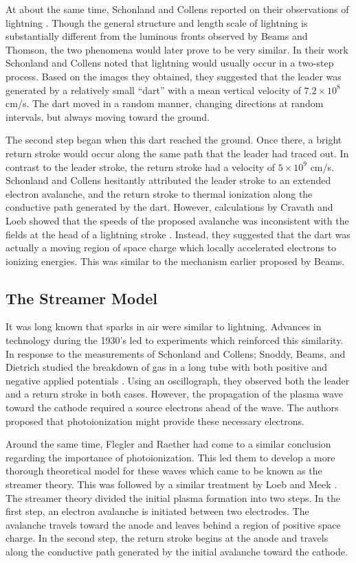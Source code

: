 At about the same time, Schonland and Collens reported on their observations of
lightning \cite{Schonland1933}. Though the general structure and length scale of
lightning is substantially different from the luminous fronts observed by Beams
and Thomson, the two phenomena would later prove to be very similar. In their
work Schonland and Collens noted that lightning would usually occur in a
two-step process. Based on the images they obtained, they suggested that
the leader was generated by a relatively small ``dart'' with a mean vertical
velocity of $7.2\times10^8$ cm/s. The dart moved in a random manner, changing
directions at random intervals, but always moving toward the ground.

The second step began when this dart reached the ground. Once there, a bright
return stroke would occur along the same path that the leader had traced out. In
contrast to the leader stroke, the return stroke had a velocity of $5\times10^9$
cm/s. Schonland and Collens hesitantly attributed the leader stroke to an
extended electron avalanche, and the return stroke to thermal ionization along
the conductive path generated by the dart. However, calculations by Cravath and
Loeb showed that the speeds of the proposed avalanche was inconsistent with the
fields at the head of a lightning stroke \cite{Cravath1935}. Instead, they
suggested that the dart was actually a moving region of space charge which
locally accelerated electrons to ionizing energies. This was similar to the
mechanism earlier proposed by Beams.

\subsection{The Streamer Model}

It was long known that sparks in air were similar to lightning. Advances in
technology during the 1930's led to experiments which reinforced this
similarity. In response to the measurements of Schonland and Collens; Snoddy,
Beams, and Dietrich studied the breakdown of gas in a long tube with both
positive and negative applied potentials \cite{Snoddy1936}. Using an
oscillograph, they observed both the leader and a return stroke in both cases.
However, the propagation of the plasma wave toward the cathode required a source
electrons ahead of the wave. The authors proposed that photoionization might
provide these necessary electrons.

Around the same time, Flegler and Raether had come to a similar conclusion
regarding the importance of photoionization. This led them to develop a more
thorough theoretical model for these waves \cite{Flegler1936} which came to be
known as the streamer theory. This was followed by a similar treatment by Loeb
and Meek \cite{Loeb1940, Loeb1940a, Meek1940}. The streamer theory divided the
initial plasma formation into two steps. In the first step, an electron
avalanche is initiated between two electrodes. The avalanche travels toward the
anode and leaves behind a region of positive space charge. In the second step,
the return stroke begins at the anode and travels along the conductive path
generated by the initial avalanche toward the cathode.

